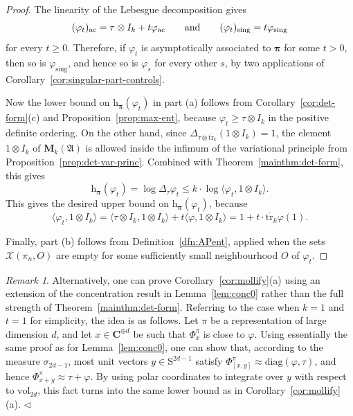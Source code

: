 \documentclass[12pt,a4paper]{article}
\numberwithin{equation}{section}
\theoremstyle{remark}
\newtheorem{rmk}[thm]{Remark}
\renewcommand{\rm}[1]{\mathrm{#1}}
\newcommand{\bbC}{\mathbf{C}}
\newcommand{\rmS}{\mathrm{S}}
\newcommand{\rmM}{\mathbf{M}}
\newcommand{\rmh}{\mathrm{h}}
\newcommand{\X}{\mathcal{X}}
\newcommand{\A}{\mathfrak{A}}
\renewcommand{\phi}{\varphi}
\newcommand{\s}{\sigma}
\newcommand{\fin}{\nolinebreak\hspace{\stretch{1}}$\lhd$}
\newcommand{\bspi}{\boldsymbol{\pi}}
\newcommand{\vol}{\mathrm{vol}}
\newcommand{\tr}{\overline{\mathrm{tr}}}
\begin{document}
\begin{proof}
The linearity of the Lebesgue decomposition gives
\[(\phi_t)_{\rm{ac}} = \tau\otimes I_k + t \phi_{\rm{ac}} \qquad \hbox{and} \qquad (\phi_t)_{\rm{sing}} = t\phi_{\rm{sing}}\]
for every $t \ge 0$.  Therefore, if $\phi_t$ is asymptotically associated to $\bspi$ for some $t > 0$, then so is $\phi_{\rm{sing}}$, and hence so is $\phi_s$ for every other $s$, by two applications of Corollary~\ref{cor:singular-part-controls}.

Now the lower bound on $\rmh_{\bspi}(\phi_t)$ in part (a) follows from Corollary~\ref{cor:det-form}(c) and Proposition~\ref{prop:max-ent}, because $\phi_t \ge \tau\otimes I_k$ in the positive definite ordering.  On the other hand, since $\Delta_{\tau\otimes \tr_k}(1\otimes I_k) = 1$, the element $1\otimes I_k$ of $\rmM_k(\A)$ is allowed inside the infimum of the variational principle from Proposition~\ref{prop:det-var-princ}. Combined with Theorem~\ref{mainthm:det-form}, this gives
\[\rmh_{\bspi}(\phi_t) = \log \Delta_\tau \phi_t \le k\cdot \log \langle \phi_t,1\otimes I_k\rangle.\]
This gives the desired upper bound on $\rmh_{\bspi}(\phi_t)$, because
\[\langle \phi_t,1\otimes I_k\rangle = \langle \tau\otimes I_k,1\otimes I_k\rangle + t\langle \phi,1\otimes I_k\rangle = 1 + t\cdot\tr_k \phi(1).\]

Finally, part (b) follows from Definition~\ref{dfn:APent}, applied when the sets $\X(\pi_n,O)$ are empty for some sufficiently small neighbourhood $O$ of $\phi_t$.
\end{proof}

\begin{rmk}
Alternatively, one can prove Corollary~\ref{cor:mollify}(a) using an extension of the concentration result in Lemma~\ref{lem:conc0} rather than the full strength of Theorem~\ref{mainthm:det-form}.  Referring to the case when $k=1$ and $t=1$ for simplicity, the idea is as follows.  Let $\pi$ be a representation of large dimension $d$, and let $x \in \bbC^{\oplus d}$ be such that $\Phi^\pi_x$ is close to $\phi$. Using essentially the same proof as for Lemma~\ref{lem:conc0}, one can show that, according to the measure $\s_{2d-1}$, most unit vectors $y \in \rmS^{2d-1}$ satisfy $\Phi^\pi_{[x,y]} \approx \rm{diag}(\phi,\tau)$, and hence $\Phi^\pi_{x+y} \approx \tau + \phi$.  By using polar coordinates to integrate over $y$ with respect to $\vol_{2d}$, this fact turns into the same lower bound as in Corollary~\ref{cor:mollify}(a). \fin
\end{rmk}
\end{document}
